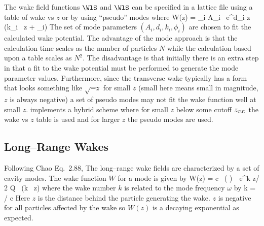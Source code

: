 The wake field functions $\WlS$ and $\WlS$ can be specified in a \bmad
lattice file using a table of wake vs $z$ or by using ``pseudo'' modes
where
\Begineq
  W(z) = \sum_i A_i \, e^{d_i z} \, \sin (k_i \, z + \phi_i)
  \label{wadzk}
\Endeq
The set of mode parameters $(A_i, d_i, k_i, \phi_i)$ are chosen to fit
the calculated wake potential. The advantage of the mode approach is that
the calculation time scales as the number of particles $N$ while the
calculation based upon a table scales as $N^2$. The disadvantage is that
initially there is an extra step in that a fit to the wake potential must
be performed to generate the mode parameter values. Furthermore, since the
transverse wake typically has a form that looks something like $\sqrt{-z}$ 
for small $z$ (small here means small in magnitude, $z$ is always negative)
a set of pseudo modes may not fit the wake function well at small $z$. 
\bmad implements a hybrid scheme where for small $z$ below some cutoff
$z_{\rm{cut}}$ the wake vs $z$ table is used and for larger $z$ the pseudo
modes are used.


\subsection{Long--Range Wakes}

Following Chao\cite{b:chao} Eq.~2.88, The long--range wake fields are
characterized by a set of cavity modes. The wake function $W$ for a
mode is given by
\Begineq
  W(z) = c \, \left(  \right) \,\,
  e^{k z/ 2 Q} \, \sin (k \, z)
  \label{wcrq}
\Endeq
where the wake number $k$ is related to the mode frequency $\omega$ by
\Begineq
  k = \omega / c
\Endeq
Here $z$ is the distance behind the particle generating the wake. $z$
is negative for all particles affected by the wake so $W(z)$ is a
decaying exponential as expected.

